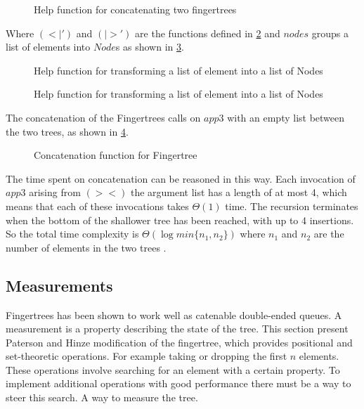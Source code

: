\begin{figure}[h!]

\caption{Help function for concatenating two fingertrees \label{fig:concatHelp}}
\end{figure}

Where $(<|')$ and $(|>')$ are the functions defined in \cref{fig:reduceAppend}
and $nodes$ groups a list of elements into $Node$s as shown in
\cref{fig:nodesHelp}. 

\begin{figure}[h!]

\caption{Help function for transforming a list of element into a list of Nodes \label{fig:reduceAppend}}
\end{figure}


\begin{figure}[h!]

\caption{Help function for transforming a list of element into a list of Nodes \label{fig:nodesHelp}}
\end{figure}

The concatenation of the Fingertrees calls on $app3$ with an empty list
between the two trees, as shown in \cref{fig:concat}.

\begin{figure}[h!]

\caption{Concatenation function for Fingertree \label{fig:concat}}
\end{figure}

The time spent on concatenation can be reasoned in this way. Each invocation of
$app3$ arising from $(><)$ the argument list has a length of at most 4, which
means that each of these invocations takes $\Theta(1)$ time. The recursion
terminates when the bottom of the shallower tree has been reached, with up to
4 insertions. So the total time complexity is $\Theta(\log min\{n_1, n_2\})$
where $n_1$ and $n_2$ are the number of elements in the two trees
\cite{fingertree}.

\subsection{Measurements}
Fingertrees has been shown to work well as catenable double-ended queues. A 
measurement is a property describing the state of the tree. This section present
Paterson and Hinze modification of the fingertree, which provides positional and
set-theoretic operations. For example taking or dropping the first $n$ elements.
These operations involve searching for an element with a certain property.
To implement additional operations with good performance there must be a way
to steer this search. A way to measure the tree.

